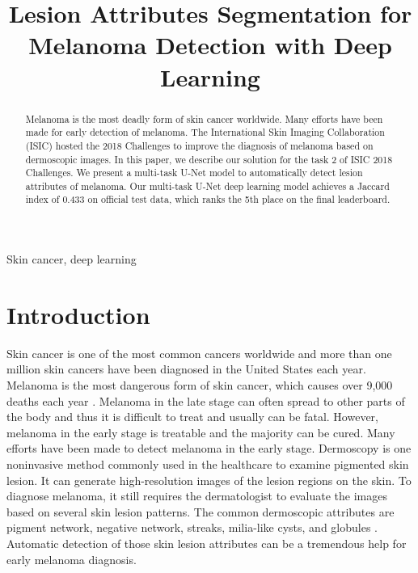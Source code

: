 \documentclass{article}
\title{Lesion Attributes Segmentation for Melanoma Detection with Deep Learning}
\begin{document}
%
\maketitle
%
\begin{abstract}
Melanoma is the most deadly form of skin cancer worldwide. Many efforts have been made for early detection of melanoma. The International Skin Imaging Collaboration (ISIC) hosted the 2018 Challenges to improve the diagnosis of melanoma based on dermoscopic images. In this paper, we describe our solution for the task 2 of ISIC 2018 Challenges. We present a multi-task U-Net model to automatically detect lesion attributes of melanoma. Our multi-task U-Net deep learning model achieves a Jaccard index of 0.433 on official test data, which ranks the 5th place on the final leaderboard. 
\end{abstract}
%
\begin{keywords}
Skin cancer, deep learning
\end{keywords}
%
\section{Introduction}
\label{sec:intro}

Skin cancer is one of the most common cancers worldwide and more than one million skin cancers have been diagnosed in the United States each year. Melanoma is the most dangerous form of skin cancer, which causes over 9,000 deaths each year \cite{ucsw2013united}. Melanoma in the late stage can often spread to other parts of the body and thus it is difficult to treat and usually can be fatal. However, melanoma in the early stage is treatable and the majority can be cured. Many efforts have been made to detect melanoma in the early stage. Dermoscopy is one noninvasive method commonly used in the healthcare to examine pigmented skin lesion. It can generate high-resolution images of the lesion regions on the skin. To diagnose melanoma, it still requires the dermatologist to evaluate the images based on several skin lesion patterns. The common dermoscopic attributes are pigment network, negative network, streaks, milia-like cysts, and globules \cite{mishra2016overview}. Automatic detection of those skin lesion attributes can be a tremendous help for early melanoma diagnosis. 
\end{document}
